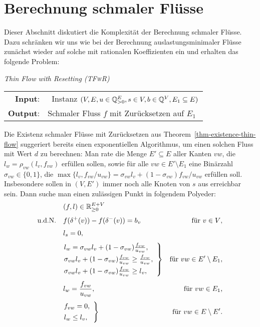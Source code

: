 \section{Berechnung schmaler Flüsse}

Dieser Abschnitt diskutiert die Komplexität der Berechnung schmaler Flüsse.
Dazu schränken wir uns wie bei der Berechnung auslastungsminimaler Flüsse zunächst wieder auf solche mit rationalen Koeffizienten ein und erhalten das folgende Problem:

\newcommand{\probTFwR}{\textit{\textsc{(TFwR)}}}

\newcommand{\probTFwoR}{\textit{\textsc{(TFwoR)}}}

\begin{center}
	\begin{mdframed}
		\centering
		\emph{Thin Flow with Resetting \probTFwR} \\[1em]
		\begin{tabular}{rl}
			{\bfseries Input}: &\problemThinFlow\ Instanz $(V, E, u \in \mathbb{Q}^E_{>0}, s\in V, b\in \mathbb{Q}^V, E_1\subseteq E)$\\
			{\bfseries Output}: &Schmaler Fluss $f$ mit Zurücksetzen auf $E_1$
		\end{tabular}
	\end{mdframed}
\end{center}

Die Existenz schmaler Flüsse mit Zurücksetzen aus Theorem~\ref{thm-existence-thin-flow} suggeriert bereits einen exponentiellen Algorithmus, um einen solchen Fluss mit Wert $d$ zu berechnen:
Man rate die Menge $E'\subseteq E$ aller Kanten $vw$, die $l_w = \rho_{vw}(l_v, f_{vw})$ erfüllen sollen, sowie für alle $vw\in E'\setminus E_1$ eine Binärzahl $\sigma_{vw}\in\{0,1\}$, die $\max\{ l_v, f_{vw}/u_{vw}\} = \sigma_{vw} l_v + (1-\sigma_{vw}) f_{vw}/u_{vw}$ erfüllen soll.
Insbesondere sollen in $(V, E')$ immer noch alle Knoten von $s$ aus erreichbar sein.
Dann suche man einen zulässigen Punkt in folgendem Polyeder:
\begin{align*}
	& (f, l) \in \R_{\geq 0}^{E + V} \\[0.3em]
	\text{u.d.N.}\quad &
	f(\delta^+(v)) - f(\delta^-(v)) = b_v& \text{für $v\in V$,} \\[0.3em]
	& l_s = 0, \\[0.3em]
	&\mathopen{}\left.\begin{array}{@{}l}
		l_w = \sigma_{vw} l_v + (1-\sigma_{vw}) \frac{f_{vw}}{u_{vw}},\\[0.4em]
		\sigma_{vw} l_v + (1-\sigma_{vw}) \frac{f_{vw}}{u_{vw}} \geq \frac{f_{vw}}{u_{vw}},\\[0.4em]
		\sigma_{vw} l_v + (1-\sigma_{vw}) \frac{f_{vw}}{u_{vw}} \geq l_v,
	\end{array} \right\}\mathclose{}
	& \text{für $vw\in E'\setminus E_1$},\\[0.3em]
	& l_w = \frac{f_{vw}}{u_{vw}}, & \text{für $vw\in E_1$,} \\[0.3em]
	& \mathopen{}\left.\begin{array}{@{}l}
	f_{vw} = 0,\\[0.4em]
	l_w \leq l_v,
	\end{array} \right\}\mathclose{} & \text{für $vw\in E\setminus E'$.}
\end{align*}

